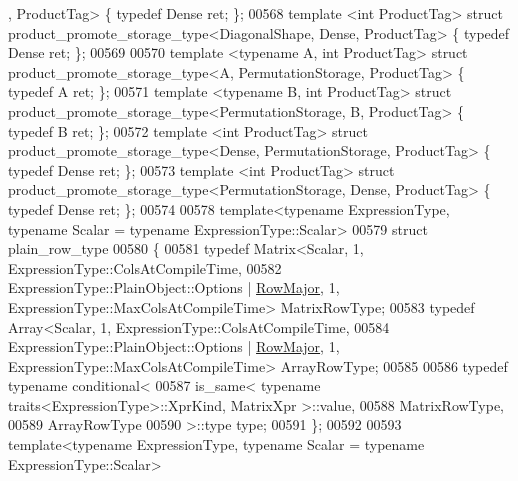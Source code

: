\begin{DoxyCode}
{      ,      ProductTag> \{ \textcolor{keyword}{typedef} Dense ret; \};
00568 \textcolor{keyword}{template} <\textcolor{keywordtype}{int} ProductTag>             \textcolor{keyword}{struct }product\_promote\_storage\_type<DiagonalShape,      Dense,       
             ProductTag> \{ \textcolor{keyword}{typedef} Dense ret; \};
00569 
00570 \textcolor{keyword}{template} <\textcolor{keyword}{typename} A, \textcolor{keywordtype}{int} ProductTag> \textcolor{keyword}{struct }product\_promote\_storage\_type<A,                  
      PermutationStorage, ProductTag> \{ \textcolor{keyword}{typedef} A ret; \};
00571 \textcolor{keyword}{template} <\textcolor{keyword}{typename} B, \textcolor{keywordtype}{int} ProductTag> \textcolor{keyword}{struct }product\_promote\_storage\_type<PermutationStorage, B,           
             ProductTag> \{ \textcolor{keyword}{typedef} B ret; \};
00572 \textcolor{keyword}{template} <\textcolor{keywordtype}{int} ProductTag>             \textcolor{keyword}{struct }product\_promote\_storage\_type<Dense,              
      PermutationStorage, ProductTag> \{ \textcolor{keyword}{typedef} Dense ret; \};
00573 \textcolor{keyword}{template} <\textcolor{keywordtype}{int} ProductTag>             \textcolor{keyword}{struct }product\_promote\_storage\_type<PermutationStorage, Dense,       
             ProductTag> \{ \textcolor{keyword}{typedef} Dense ret; \};
00574 
00578 \textcolor{keyword}{template}<\textcolor{keyword}{typename} ExpressionType, \textcolor{keyword}{typename} Scalar = \textcolor{keyword}{typename} ExpressionType::Scalar>
00579 \textcolor{keyword}{struct }plain\_row\_type
00580 \{
00581   \textcolor{keyword}{typedef} Matrix<Scalar, 1, ExpressionType::ColsAtCompileTime,
00582                  ExpressionType::PlainObject::Options | \hyperlink{group__enums_ggaacded1a18ae58b0f554751f6cdf9eb13acfcde9cd8677c5f7caf6bd603666aae3}{RowMajor}, 1, 
      ExpressionType::MaxColsAtCompileTime> MatrixRowType;
00583   \textcolor{keyword}{typedef} Array<Scalar, 1, ExpressionType::ColsAtCompileTime,
00584                  ExpressionType::PlainObject::Options | \hyperlink{group__enums_ggaacded1a18ae58b0f554751f6cdf9eb13acfcde9cd8677c5f7caf6bd603666aae3}{RowMajor}, 1, 
      ExpressionType::MaxColsAtCompileTime> ArrayRowType;
00585 
00586   \textcolor{keyword}{typedef} \textcolor{keyword}{typename} conditional<
00587     is\_same< typename traits<ExpressionType>::XprKind, MatrixXpr >::value,
00588     MatrixRowType,
00589     ArrayRowType 
00590   >::type type;
00591 \};
00592 
00593 \textcolor{keyword}{template}<\textcolor{keyword}{typename} ExpressionType, \textcolor{keyword}{typename} Scalar = \textcolor{keyword}{typename} ExpressionType::Scalar>
}
\end{DoxyCode}
